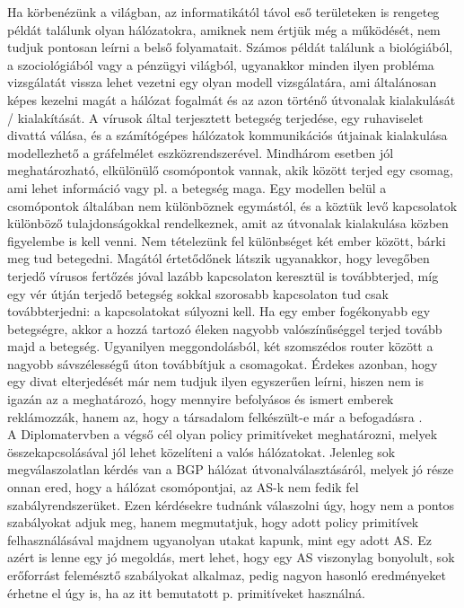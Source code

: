 Ha körbenézünk a világban, az informatikától távol eső területeken is rengeteg példát találunk olyan hálózatokra, amiknek nem értjük még a működését, nem tudjuk pontosan leírni a belső folyamatait. Számos példát találunk a biológiából, a szociológiából vagy a pénzügyi világból, ugyanakkor minden ilyen probléma vizsgálatát vissza lehet vezetni egy olyan modell vizsgálatára, ami általánosan képes kezelni magát a hálózat fogalmát és az azon történő útvonalak kialakulását / kialakítását. A vírusok által terjesztett betegség terjedése, egy ruhaviselet divattá válása, és a számítógépes hálózatok kommunikációs útjainak kialakulása modellezhető a gráfelmélet eszközrendszerével. Mindhárom esetben jól meghatározható, elkülönülő csomópontok vannak, akik között terjed egy csomag, ami lehet információ vagy pl. a betegség maga. Egy modellen belül a csomópontok általában nem különböznek egymástól, és a köztük levő kapcsolatok különböző tulajdonságokkal rendelkeznek, amit az útvonalak kialakulása közben figyelembe is kell venni. Nem tételezünk fel különbséget két ember között, bárki meg tud betegedni. Magától értetődőnek látszik ugyanakkor, hogy levegőben terjedő vírusos fertőzés jóval lazább kapcsolaton keresztül is továbbterjed, míg egy vér útján terjedő betegség sokkal szorosabb kapcsolaton tud csak továbbterjedni: a kapcsolatokat súlyozni kell. Ha egy ember fogékonyabb egy betegségre, akkor a hozzá tartozó éleken nagyobb valószínűséggel terjed tovább majd a betegség. Ugyanilyen meggondolásból, két szomszédos router között a nagyobb sávszélességű úton továbbítjuk a csomagokat. Érdekes azonban, hogy egy divat elterjedését már nem tudjuk ilyen egyszerűen leírni, hiszen nem is igazán az a meghatározó, hogy mennyire befolyásos és ismert emberek reklámozzák, hanem az, hogy a társadalom felkészült-e már a befogadásra \cite{DuncanWatts, DobreiMScOnlab1}.\\

A Diplomatervben a végső cél olyan policy primitíveket meghatározni, melyek összekapcsolásával jól lehet közelíteni a valós hálózatokat. Jelenleg sok megválaszolatlan kérdés van a BGP hálózat útvonalválasztásáról, melyek jó része onnan ered, hogy a hálózat csomópontjai, az AS-k nem fedik fel szabályrendszerüket. Ezen kérdésekre tudnánk válaszolni úgy, hogy nem a pontos szabályokat adjuk meg, hanem megmutatjuk, hogy adott policy primitívek felhasználásával majdnem ugyanolyan utakat kapunk, mint egy adott AS. Ez azért is lenne egy jó megoldás, mert lehet, hogy egy AS viszonylag bonyolult, sok erőforrást felemésztő szabályokat alkalmaz, pedig nagyon hasonló eredményeket érhetne el úgy is, ha az itt bemutatott p. primitíveket használná.\\

